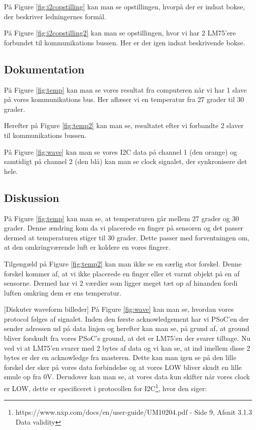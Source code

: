 \documentclass[../main.tex]{subfiles}
\begin{document}
På Figure \ref{fig:i2copstilling} kan man se opstillingen, hvorpå der er indsat bokse, der beskriver ledningernes formål.


På Figure \ref{fig:i2copstilling2} kan man se opstillingen, hvor vi har 2 LM75'ere forbundet til kommunikations bussen. Her er der igen indsat beskrivende bokse.

\subsection{Dokumentation}

På Figure \ref{fig:temp} kan man se vores resultat fra computeren når vi har 1 slave på vores kommunikations bus. Her aflæser vi en temperatur fra 27 grader til 30 grader.

Herefter på Figure \ref{fig:temp2} kan man se, resultatet efter vi forbandte 2 slaver til kommunikations bussen.

På Figure \ref{fig:wave} kan man se vores I2C data på channel 1 (den orange) og samtidigt på channel 2 (den blå) kan man se clock signalet, der synkronisere det hele.


\subsection{Diskussion}
På Figure \ref{fig:temp} kan man se, at temperaturen går mellem 27 grader og 30 grader. Denne ændring kom da vi placerede en finger på sensoren og det passer dermed at temperaturen stiger til 30 grader.
Dette passer med forventningen om, at den omkringværende luft er koldere en vores fingrer.

Tilgengæld på Figure \ref{fig:temp2} kan man ikke se en særlig stor forskel. Denne forskel kommer af, at vi ikke placerede en finger eller et varmt objekt på en af sensorne. 
Dermed har vi 2 værdier som ligger meget tæt op af hinanden fordi luften omkring dem er ens temperatur.

[Diskuter waveform billeder]
På Figure \ref{fig:wave} kan man se, hvordan vores protocol følges af signalet. 
Inden den første acknowledgement har vi PSoC'en der sender adressen ud på data linjen og herefter kan man se, på grund af, at ground bliver forskudt fra vores PSoC's ground, at det er LM75'en der svarer tilbage.
Nu ved vi at LM75'en svarer med 2 bytes af data og vi kan se, at ind imellem disse 2 bytes er der en acknowledge fra masteren. Dette kan man igen se på den lille forskel der sker på vores data forbindelse og at vores LOW bliver skudt en lille smule op fra 0V.
Derudover kan man se, at vores data kun skifter når vores clock er LOW, dette er specificeret i protocollen for I2C\footnote{https://www.nxp.com/docs/en/user-guide/UM10204.pdf - Side 9, Afsnit 3.1.3 Data validity}, hvor den siger:
\end{document}
